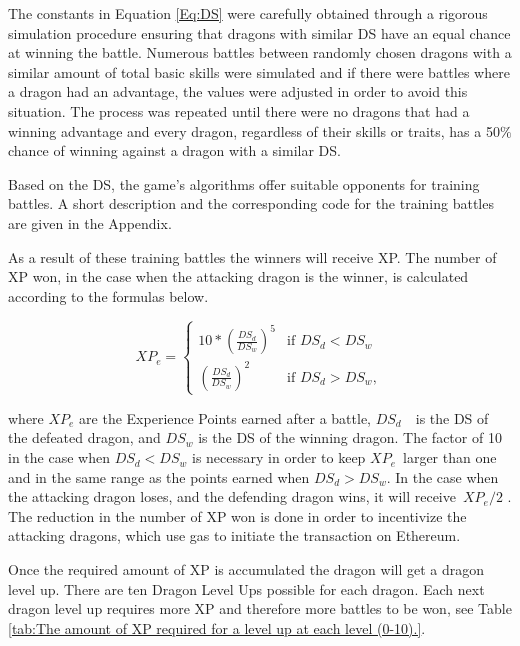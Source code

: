 \documentclass[12pt]{article}
\begin{document}
{The constants in Equation \ref{Eq:DS} were carefully obtained through a rigorous simulation procedure ensuring that dragons with similar DS have an equal chance at winning the battle. Numerous battles between randomly chosen dragons with a similar amount of total basic skills were simulated and if there were battles where a dragon had an advantage, the values were adjusted in order to avoid this situation. The process was repeated until there were no dragons that had a winning advantage and every dragon, regardless of their skills or traits, has a 50$\%$  chance of winning against a dragon with a similar DS.\par

Based on the DS, the game’s algorithms offer suitable opponents for training battles. A short description and the corresponding code for the training battles are given in the Appendix.\par

As a result of these training battles the winners will receive XP. The number of XP won, in the case when the attacking dragon is the winner, is calculated according to the formulas below.\par


\begin{center}
  \begin{equation}
    XP_e= \begin{cases}
    10*\left(\frac{DS_{d}}{DS_{w}}\right)^5 & \mbox{if } DS_{d} < DS_{w}\\
    \left(\frac{DS_{d}}{DS_{w}}\right)^2 & \mbox{if } DS_{d} > DS_{w},
    \end{cases}
  \end{equation}
\end{center}

\vspace{\baselineskip}
where $XP_e$ are the Experience Points earned after a battle, $DS_{d}$\ \  is the DS of the defeated dragon, and $DS_{w}$ is the DS of the winning dragon. The factor of 10 in the case when  $DS_d<DS_w$ is necessary in order to keep $XP_e$\ larger than one and in the same range as the points earned when   $DS_d>DS_w$. In the case when the attacking dragon loses, and the defending dragon wins, it will receive\  $XP_e/2$ . The reduction in the number of XP won is done in order to incentivize the attacking dragons, which use gas to initiate the transaction on Ethereum.\par

Once the required amount of XP is accumulated the dragon will get a dragon level up. There are ten Dragon Level Ups possible for each dragon. Each next dragon level up requires more XP and therefore more battles to be won, see  Table \ref{tab:The amount of XP required for a level up at each level (0-10).}.\par

}
\end{document}
